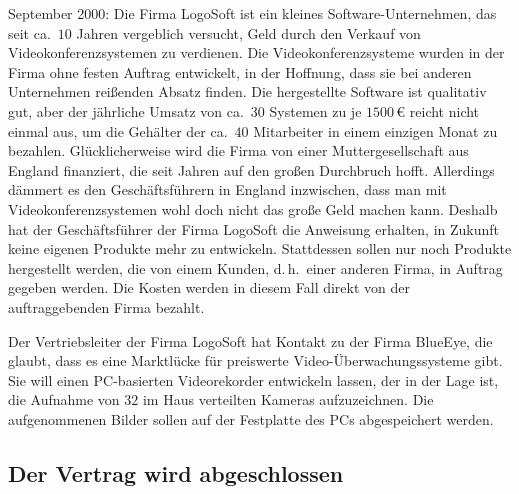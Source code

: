 September 2000: Die Firma LogoSoft ist ein kleines Software-Unternehmen, das
seit ca.\ $10$ Jahren vergeblich versucht, Geld durch den Verkauf von
Videokonferenzsystemen zu verdienen. Die Videokonferenzsysteme wurden in der
Firma ohne festen Auftrag entwickelt, in der Hoffnung, dass sie bei anderen
Unternehmen reißenden Absatz finden. Die hergestellte Software ist qualitativ
gut, aber der jährliche Umsatz von ca.\ $30$ Systemen zu je $1500\,\text{€}$ reicht nicht
einmal aus, um die Gehälter der ca.\ $40$ Mitarbeiter in einem einzigen Monat zu
bezahlen. Glücklicherweise wird die Firma von einer Muttergesellschaft aus
England finanziert, die seit Jahren auf den großen Durchbruch hofft. Allerdings
dämmert es den Geschäftsführern in England inzwischen, dass man mit
Videokonferenzsystemen wohl doch nicht das große Geld machen kann. Deshalb hat
der Geschäftsführer der Firma LogoSoft die Anweisung erhalten, in Zukunft keine
eigenen Produkte mehr zu entwickeln. Stattdessen sollen nur noch Produkte
hergestellt werden, die von einem Kunden, d.\,h.\ einer anderen Firma, in Auftrag
gegeben werden. Die Kosten werden in diesem Fall direkt von der auftraggebenden
Firma bezahlt.

Der Vertriebsleiter der Firma LogoSoft hat Kontakt zu der Firma BlueEye, die
glaubt, dass es eine Marktlücke für preiswerte Video-Überwachungssysteme gibt.
Sie will einen PC-basierten Videorekorder entwickeln lassen, der in der Lage
ist, die Aufnahme von $32$ im Haus verteilten Kameras aufzuzeichnen. Die
aufgenommenen Bilder sollen auf der Festplatte des PCs abgespeichert werden.

\subsection{Der Vertrag wird abgeschlossen}

